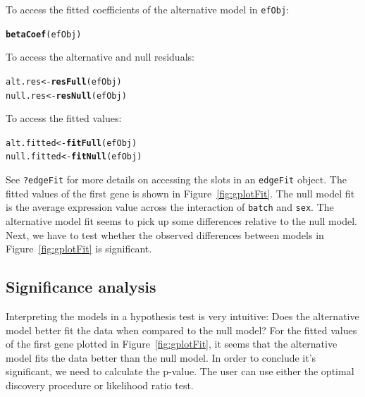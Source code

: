 \documentclass{article}\usepackage[]{graphicx}\usepackage[]{color}
\makeatletter
\newcommand{\hlstd}[1]{\textcolor[rgb]{0.345,0.345,0.345}{#1}}%
\newcommand{\hlkwb}[1]{\textcolor[rgb]{0.69,0.353,0.396}{#1}}%
\newcommand{\hlkwd}[1]{\textcolor[rgb]{0.737,0.353,0.396}{\textbf{#1}}}%
\newenvironment{kframe}{%
 \def\at@end@of@kframe{}%
 \ifinner\ifhmode%
  \def\at@end@of@kframe{\end{minipage}}%
  \begin{minipage}{\columnwidth}%
 \fi\fi%
 \def\FrameCommand##1{\hskip\@totalleftmargin \hskip-\fboxsep
 \colorbox{shadecolor}{##1}\hskip-\fboxsep
     \hskip-\linewidth \hskip-\@totalleftmargin \hskip\columnwidth}%
 \MakeFramed {\advance\hsize-\width
   \@totalleftmargin\z@ \linewidth\hsize
   \@setminipage}}%
 {\par\unskip\endMakeFramed%
 \at@end@of@kframe}
\newenvironment{knitrout}{}{} %
\makeatother
\begin{document}
To access the fitted coefficients of the alternative model in {\tt efObj}:
\begin{knitrout}
\color{fgcolor}\begin{kframe}
\begin{alltt}
\hlkwd{betaCoef}\hlstd{(efObj)}
\end{alltt}
\end{kframe}
\end{knitrout}
To access the alternative and null residuals:
\begin{knitrout}
\color{fgcolor}\begin{kframe}
\begin{alltt}
\hlstd{alt.res} \hlkwb{<-} \hlkwd{resFull}\hlstd{(efObj)}
\hlstd{null.res} \hlkwb{<-} \hlkwd{resNull}\hlstd{(efObj)}
\end{alltt}
\end{kframe}
\end{knitrout}
To access the fitted values:
\begin{knitrout}
\color{fgcolor}\begin{kframe}
\begin{alltt}
\hlstd{alt.fitted} \hlkwb{<-} \hlkwd{fitFull}\hlstd{(efObj)}
\hlstd{null.fitted} \hlkwb{<-} \hlkwd{fitNull}\hlstd{(efObj)}
\end{alltt}
\end{kframe}
\end{knitrout}

See {\tt ?edgeFit} for more details on accessing the slots in an {\tt edgeFit} object. The fitted values of the first gene is shown in Figure~\ref{fig:gplotFit}. The null model fit is the average expression value across the interaction of {\tt batch} and {\tt sex}. The alternative model fit seems to pick up some differences relative to the null model. Next, we have to test whether the observed differences between models in Figure~\ref{fig:gplotFit} is significant.

\subsection{Significance analysis}
Interpreting the models in a hypothesis test is very intuitive: Does the alternative model better fit the data when compared to the null model? For the fitted values of the first gene plotted in Figure~\ref{fig:gplotFit}, it seems that the alternative model fits the data better than the null model. In order to conclude it's significant, we need to calculate the p-value. The user can use either the optimal discovery procedure or likelihood ratio test. 
\end{document}
